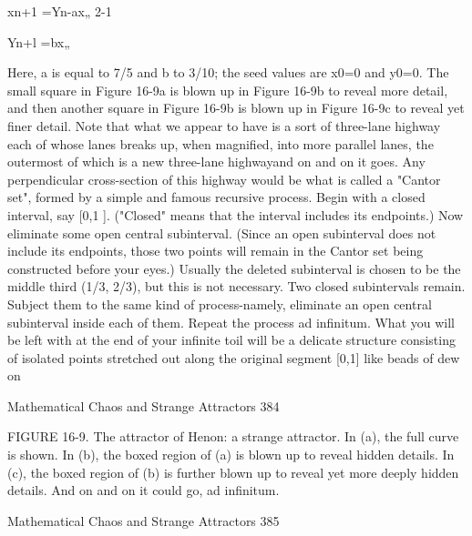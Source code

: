        xn+1 =Yn-ax„ 2-1

       Yn+l =bx„

Here, a is equal to 7/5 and b to 3/10; the seed values are x0=0 and y0=0. The small
square in Figure 16-9a is blown up in Figure 16-9b to reveal more detail, and then
another square in Figure 16-9b is blown up in Figure 16-9c to reveal yet finer detail.
Note that what we appear to have is a sort of three-lane highway each of whose lanes
breaks up, when magnified, into more parallel lanes, the outermost of which is a new
three-lane highwayand on and on it goes. Any perpendicular cross-section of this
highway would be what is called a "Cantor set", formed by a simple and famous
recursive process.
        Begin with a closed interval, say [0,1 ]. ("Closed" means that the interval
includes its endpoints.) Now eliminate some open central subinterval. (Since an open
subinterval does not include its endpoints, those two points will remain in the Cantor
set being constructed before your eyes.) Usually the deleted subinterval is chosen to
be the middle third (1/3, 2/3), but this is not necessary. Two closed subintervals
remain. Subject them to the same kind of process-namely, eliminate an open central
subinterval inside each of them. Repeat the process ad infinitum. What you will be
left with at the end of your infinite toil will be a delicate structure consisting of
isolated points stretched out along the original segment [0,1] like beads of dew on




Mathematical Chaos and Strange Attractors                                              384

FIGURE 16-9. The attractor of Henon: a strange attractor. In (a), the full curve is
shown. In (b), the boxed region of (a) is blown up to reveal hidden details. In (c), the
boxed region of (b) is further blown up to reveal yet more deeply hidden details. And
on and on it could go, ad infinitum.




Mathematical Chaos and Strange Attractors                                           385

